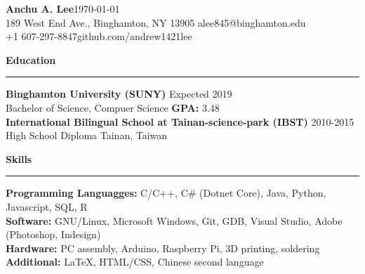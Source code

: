 \documentclass[11pt]{article}
\newcommand{\Hrule}{\vspace{1mm}\hrule\vspace{1mm}}
\begin{document}
    \noindent\Large\textbf{Anchu A. Lee}\hfill \small\monthyear\today\\
    \noindent\small{189 West End Ave., Binghamton, NY 13905} \hfill \small{alee845@binghamton.edu}\\
    \noindent\small{+1 607-297-8847}\hfill \small{github.com/andrew1421lee}\vspace{1mm}

    \noindent\large\textbf{Education}
    \Hrule
        \indent \small\textbf{Binghamton University (SUNY)} \hfill \small{Expected 2019}\indent\\
            \indent\indent\small{Bachelor of Science, Compuer Science \textbar \textbf{ GPA:} 3.48}\vspace{1mm}\\
        \indent \small\textbf{International Bilingual School at Tainan-science-park (IBST)} \hfill \small{2010-2015}\indent\\
            \indent\indent \small{High School Diploma } \hfill \small{Tainan, Taiwan}\indent\vspace{1mm}

    \noindent\large\textbf{Skills}
    \Hrule
        \indent \small\textbf{Programming Languagges: }\small{C/C++, C\# (Dotnet Core), Java, Python, Javascript, SQL, R}\vspace{0.5mm} \\
        \indent \small\textbf{Software: }\small{GNU/Linux, Microsoft Windows, Git, GDB, Visual Studio, Adobe (Photoshop, Indesign)}\vspace{0.5mm}\\
        \indent \small\textbf{Hardware: }\small{PC assembly, Arduino, Raspberry Pi, 3D printing, soldering}\vspace{0.5mm}\\
        \indent \small\textbf{Additional: }\small{LaTeX, HTML/CSS, Chinese second language}\vspace{1mm}
\end{document}
